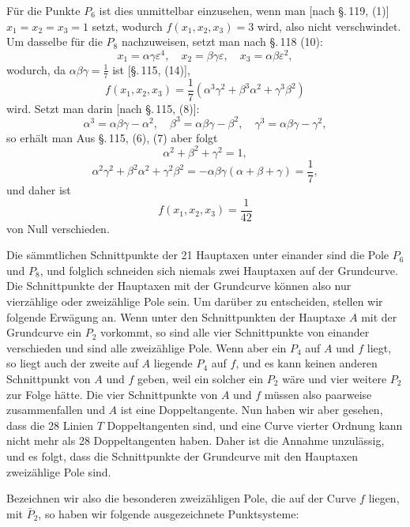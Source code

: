 Für die Punkte $P_6$ ist dies unmittelbar einzusehen, wenn man
[nach \S.\,119, (1)] $x_1 = x_2 = x_3 = 1$ setzt, wodurch
$f(x_1, x_2, x_3) = 3$ wird, also nicht verschwindet. Um dasselbe für
die $P_8$ nachzuweisen, setzt man nach \S.\,118 (10):
\[
x_1 = \alpha\gamma\varepsilon^4, \quad x_2 = \beta\gamma\varepsilon,
\quad x_3 = \alpha\beta\varepsilon^2,
\]
wodurch, da $\alpha\beta\gamma = \frac{1}{7}$ ist [\S.\,115, (14)],
\[
f(x_1, x_2, x_3) = \frac{1}{7}(\alpha^3\gamma^2 + \beta^3\alpha^2 + \gamma^3\beta^2)
\]
wird. Setzt man darin [nach \S.\,115, (8)]:
\[
\alpha^3 = \alpha\beta\gamma - \alpha^2, \quad \beta^3 = \alpha\beta\gamma - \beta^2,
\quad \gamma^3 = \alpha\beta\gamma - \gamma^2,
\]
so erhält man
Aus \S.\,115, (6), (7) aber folgt
\[
\alpha^2 + \beta^2 + \gamma^2 = 1,
\]
\[
\alpha^2\gamma^2 + \beta^2\alpha^2 + \gamma^2\beta^2 = -\alpha\beta\gamma(\alpha+\beta+\gamma) = \frac{1}{7},
\]
und daher ist
\[
f(x_1, x_2, x_3) = \frac{1}{42}
\]
von Null verschieden.

Die sämmtlichen Schnittpunkte der 21 Hauptaxen unter einander sind
die Pole $P_6$ und $P_8$, und folglich schneiden sich niemals zwei
Hauptaxen auf der Grundcurve. Die Schnittpunkte der Hauptaxen mit der
Grundcurve können also nur vierzählige oder zweizählige Pole sein. Um
darüber zu entscheiden, stellen wir folgende Erwägung an. Wenn unter
den Schnittpunkten der Hauptaxe $A$ mit der Grundcurve ein $P_2$
vorkommt, so sind alle vier Schnittpunkte von einander verschieden und
sind alle zweizählige Pole. Wenn aber ein $P_4$ auf $A$ und $f$ liegt,
so liegt auch der zweite auf $A$ liegende $P_4$ auf $f$, und es kann
keinen anderen Schnittpunkt von $A$ und $f$ geben, weil ein solcher
ein $P_2$ wäre und vier weitere $P_2$ zur Folge hätte. Die vier
Schnittpunkte von $A$ und $f$ müssen also paarweise zusammenfallen und
$A$ ist eine Doppeltangente. Nun haben wir aber gesehen, dass die 28
Linien $T$ Doppeltangenten sind, und eine Curve vierter Ordnung kann
nicht mehr als 28 Doppeltangenten haben. Daher ist die Annahme
unzulässig, und es folgt, dass die Schnittpunkte der Grundcurve mit
den Hauptaxen zweizählige Pole sind.

Bezeichnen wir also die besonderen zweizähligen Pole, die auf der
Curve $f$ liegen, mit $\bar P_2$, so haben wir folgende ausgezeichnete
Punktsysteme:
